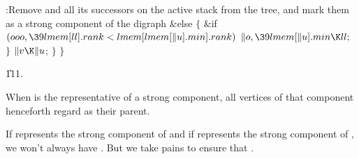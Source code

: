 :Remove  and all its successors on the active stack from the tree,
and mark them as a strong component of the digraph\X\2\6
\&{else}\5
${}\{{}$\1\6
\&{if} ${}(\\{ooo},\39\\{lmem}[\\{ll}].\\{rank}<\\{lmem}[\\{lmem}[\|u].%
\\{min}].\\{rank}){}$\1\5
${}\|o,\39\\{lmem}[\|u].\\{min}\K\\{ll};{}$\2\6
\4${}\}{}$\2\6
${}\|v\K\|u{}$;\6
\4${}\}{}$\2\6
\4${}\}{}$\2\par
\U111.\fi

When  is the representative of a strong component,
all vertices of
that component henceforth regard  as their parent.

If  represents the strong component of  and if 
represents the
strong component of , we won't always have .
But we take pains to ensure that .

